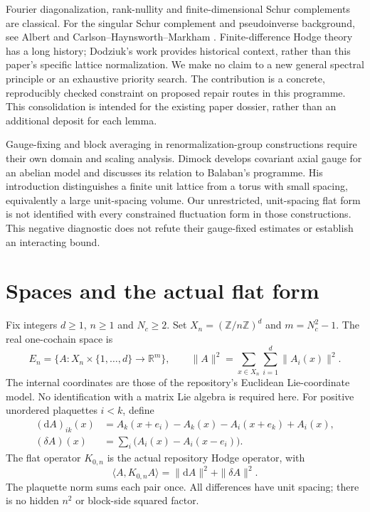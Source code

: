 \documentclass[11pt]{article}
\newcommand{\R}{\mathbb R}
\newcommand{\ip}[2]{\langle #1,#2\rangle}
\begin{document}
Fourier diagonalization, rank-nullity and finite-dimensional Schur complements
are classical. For the singular Schur complement and pseudoinverse background,
see Albert and Carlson--Haynsworth--Markham \cite{albert,carlson}. Finite-difference Hodge theory has a long history; Dodziuk's
work \cite{dodziuk} provides historical context, rather than this paper's
specific lattice normalization. We make no claim to a new general spectral
principle or an exhaustive priority search. The contribution is a concrete,
reproducibly checked constraint on proposed repair routes in this programme.
This consolidation is intended for the existing paper dossier, rather than
an additional deposit for each lemma.

Gauge-fixing and block averaging in renormalization-group constructions
require their own domain and scaling analysis. Dimock \cite{dimock} develops
covariant axial gauge for an abelian model and discusses its relation to
Balaban's programme. His introduction distinguishes a finite unit lattice
from a torus with small spacing, equivalently a large unit-spacing volume.
Our unrestricted, unit-spacing flat form is not identified with every
constrained fluctuation form in those constructions. This negative diagnostic
does not refute their gauge-fixed estimates or establish an interacting bound.

\section{Spaces and the actual flat form}
Fix integers $d\geq1$, $n\geq1$ and $N_c\geq2$. Set
$X_n=(\mathbb Z/n\mathbb Z)^d$ and $m=N_c^2-1$. The real one-cochain space is
\[
 E_n=\{A:X_n\times\{1,\ldots,d\}\longrightarrow\R^m\},\qquad
 \|A\|^2=\sum_{x\in X_n}\sum_{i=1}^d\|A_i(x)\|^2.
\]
The internal coordinates are those of the repository's Euclidean Lie-coordinate
model. No identification with a matrix Lie algebra is required here.
For positive unordered plaquettes $i<k$, define
\begin{align*}
 (\mathrm dA)_{ik}(x)&=A_k(x+e_i)-A_k(x)-A_i(x+e_k)+A_i(x),\\
 (\delta A)(x)&=\sum_i\bigl(A_i(x)-A_i(x-e_i)\bigr).
\end{align*}
The flat operator $K_{0,n}$ is the actual repository Hodge operator, with
\begin{equation}\label{eq:hodge}
 \ip{A}{K_{0,n}A}=\|\mathrm dA\|^2+\|\delta A\|^2.
\end{equation}
The plaquette norm sums each pair once. All differences have unit spacing;
there is no hidden $n^2$ or block-side squared factor.
\end{document}
